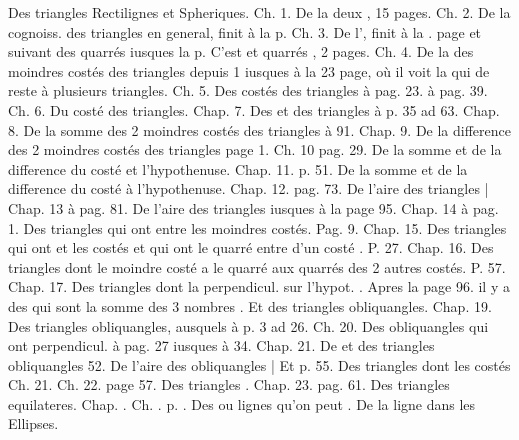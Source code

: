 \documentclass[11pt,a4paper]{article}
\begin{document}

Des triangles Rectilignes et Spheriques. Ch. 1. De la  \ill{} deux \ill{} \ill{}, 15 pages. Ch. 2. De la cognoiss. des triangles en general, finit à la  p. Ch. 3. De l', finit à la . page et suivant \ill{} \ill{} des quarrés iusques \ill{}  \ill{} la  p. C'est \ill{} \ill{} \ill{} et quarrés , 2 pages. Ch. 4. De la \ill{} des moindres costés des triangles depuis 1 iusques à la 23 page, où il voit la  qui \ill{} de reste à plusieurs triangles. Ch. 5. Des costés \ill{} des triangles à pag. 23. à pag. 39. Ch. 6. Du costé  des triangles. Chap. 7. Des  et  des triangles à p. 35 \ill{} ad 63. Chap. 8. De la somme des 2 moindres costés des triangles \ill{} à 91. Chap. 9. De la difference des 2 moindres costés des triangles page 1. Ch. 10 pag. 29. De la somme et de la difference du costé  et l'hypothenuse. Chap. 11. p. 51. De la somme et de la difference du costé  à l'hypothenuse. Chap. 12. pag. 73. De l'aire des triangles | Chap. 13 à pag. 81. De l'aire des triangles iusques à la page 95. Chap. 14 à pag. 1. Des triangles qui ont \ill{} \ill{} entre les moindres costés. Pag. 9. Chap. 15. Des triangles qui ont \ill{} \ill{} et les costés et qui ont le quarré \ill{} \ill{} entre \ill{} d'un costé \ill{}. P. 27. Chap. 16. Des triangles dont le moindre costé a le quarré \ill{} aux quarrés des 2 autres costés. P. 57. Chap. 17. Des triangles dont la perpendicul. \ill{} sur l'hypot. \ill{} \ill{}. Apres la page 96. il y a des \ill{} qui sont la somme des 3 nombres . Et \ill{} des triangles obliquangles. Chap. 19. Des triangles obliquangles, ausquels \ill{} \ill{} \ill{} \ill{} à p. 3 ad 26. Ch. 20. Des obliquangles qui ont \ill{} \ill{} perpendicul. à pag. 27 iusques à 34. Chap. 21. De \ill{} et \ill{} des triangles obliquangles  52. De l'aire des obliquangles | Et \ill{} p. 55. Des triangles dont les costés \ill{} \ill{} \ill{} \ill{} \ill{} Ch. 21. Ch. 22. page 57. Des triangles  . Chap. 23. pag. 61. Des triangles equilateres. Chap. . Ch. . p. . Des  ou lignes \ill{} qu'on peut \ill{}  \ill{}. De la ligne \ill{} \ill{} dans les Ellipses.
\end{document}
